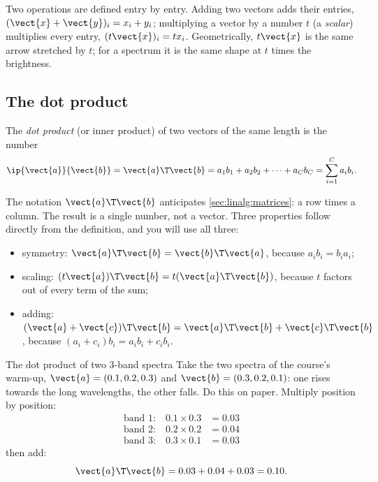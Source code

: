 Two operations are defined entry by entry. Adding two vectors adds their entries,
$(\vect{x}+\vect{y})_i = x_i + y_i$; multiplying a vector by a number $t$ (a \emph{scalar})
multiplies every entry, $(t\vect{x})_i = t x_i$. Geometrically, $t\vect{x}$ is the same arrow
stretched by $t$; for a spectrum it is the same shape at $t$ times the brightness.

\subsection{The dot product}

\begin{definition}
The \emph{dot product} (or inner product) of two vectors of the same length is the number
\begin{equation}\label{eq:linalg:dot}
\ip{\vect{a}}{\vect{b}} = \vect{a}\T\vect{b} = a_1 b_1 + a_2 b_2 + \cdots + a_C b_C
= \sum_{i=1}^{C} a_i b_i .
\end{equation}
\end{definition}

The notation $\vect{a}\T\vect{b}$ anticipates \cref{sec:linalg:matrices}: a row times a column.
The result is a single number, not a vector. Three properties follow directly from the
definition, and you will use all three:
\begin{itemize}
  \item symmetry: $\vect{a}\T\vect{b} = \vect{b}\T\vect{a}$, because $a_i b_i = b_i a_i$;
  \item scaling: $(t\vect{a})\T\vect{b} = t(\vect{a}\T\vect{b})$, because $t$ factors out of
    every term of the sum;
  \item adding: $(\vect{a}+\vect{c})\T\vect{b} = \vect{a}\T\vect{b} + \vect{c}\T\vect{b}$,
    because $(a_i + c_i)b_i = a_i b_i + c_i b_i$.
\end{itemize}

\begin{worked}[label={we:linalg:dot}]{The dot product of two 3-band spectra}
Take the two spectra of the course's warm-up, $\vect{a} = (0.1, 0.2, 0.3)$ and
$\vect{b} = (0.3, 0.2, 0.1)$: one rises towards the long wavelengths, the other falls.
Do this on paper. Multiply position by position:
\begin{align*}
\text{band 1:}\quad 0.1 \times 0.3 &= 0.03\\
\text{band 2:}\quad 0.2 \times 0.2 &= 0.04\\
\text{band 3:}\quad 0.3 \times 0.1 &= 0.03
\end{align*}
then add:
\[
\vect{a}\T\vect{b} = 0.03 + 0.04 + 0.03 = 0.10 .
\]
\end{worked}

